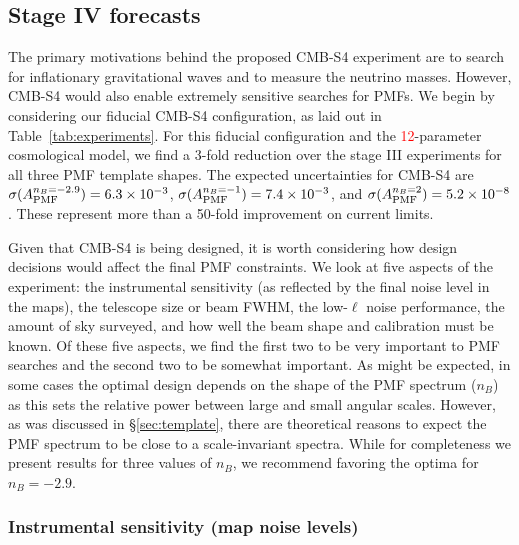 \documentclass[apj]{emulateapj}
\newcommand{\apmf}{\ensuremath{A_{\rm PMF}}}
\newcommand{\changed}[1]{\textcolor{Red}{#1}}
\begin{document}
\subsection{Stage IV forecasts}

The primary motivations behind the proposed CMB-S4 experiment are to search for inflationary gravitational waves and to measure the neutrino masses.
However, CMB-S4 would also enable extremely sensitive searches for PMFs. 
We begin by considering our fiducial CMB-S4 configuration, as laid out in Table~\ref{tab:experiments}. 
For this fiducial configuration and the \changed{12}-parameter cosmological model, we find a 3-fold reduction over the stage III experiments for all three PMF template shapes. 
The expected uncertainties for CMB-S4 are $\sigma(\apmf^{n_B=-2.9}) =   \fisherAlooseSFour$, $\sigma(\apmf^{n_B=-1}) =   \fisherAlooseNbOneSFour$, and $\sigma(\apmf^{n_B=2}) =   \fisherAlooseNbTwoSFour$. 
These represent more than a 50-fold improvement on current limits. 


Given that CMB-S4 is being designed, it is worth considering how design decisions would affect the final PMF constraints. 
We look at five aspects of the experiment: the instrumental sensitivity (as reflected by the final noise level in the maps), the telescope size or beam FWHM,  the low-$\ell$ noise performance, the amount of sky surveyed,  and how well the beam shape and calibration must be known. 
Of these five aspects, we find the first two to be very important to PMF searches and the second two to be somewhat important. 
As might be expected, in some cases the optimal design depends on the shape of the PMF spectrum ($n_B$) as this sets  the relative power between large and small angular scales.  
However, as was discussed in \S\ref{sec:template},  there are theoretical reasons to expect the PMF spectrum to be close to a scale-invariant spectra. 
While for completeness we present results for three values of $n_B$, we recommend favoring the optima for $n_B=-2.9$. 

\subsubsection{Instrumental sensitivity (map noise levels)}
\end{document}
